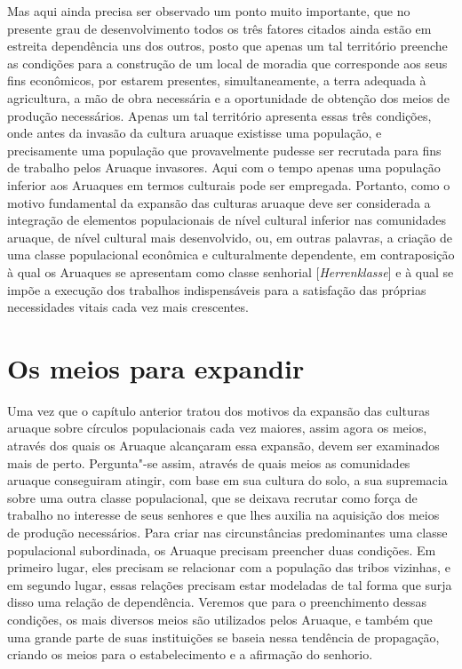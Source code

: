 Mas aqui ainda precisa ser observado um ponto muito importante, que no
presente grau de desenvolvimento todos os três fatores citados ainda
estão em estreita dependência uns dos outros, posto que apenas um tal
território preenche as condições para a construção de um local de
moradia que corresponde aos seus fins econômicos, por estarem presentes,
simultaneamente, a terra adequada à agricultura, a mão de obra
necessária e a oportunidade de obtenção dos meios de produção
necessários. Apenas um tal território apresenta essas três condições,
onde antes da invasão da cultura aruaque existisse uma população, e
precisamente uma população que provavelmente pudesse ser recrutada para
fins de trabalho pelos Aruaque invasores. Aqui com o tempo apenas uma
população inferior aos Aruaques em termos culturais pode ser empregada.
Portanto, como o motivo fundamental da expansão das culturas aruaque
deve ser considerada a integração de elementos populacionais de nível
cultural inferior nas comunidades aruaque, de nível cultural mais
desenvolvido, ou, em outras palavras, a criação de uma classe
populacional econômica e culturalmente dependente, em contraposição à
qual os Aruaques se apresentam como classe senhorial
{[}\emph{Herrenklasse}{]} e à qual se impõe a execução dos trabalhos
indispensáveis para a satisfação das próprias necessidades vitais cada
vez mais crescentes.


\chapter*{Os meios para expandir\smallskip{}}

Uma vez que o capítulo anterior tratou dos motivos da expansão das
culturas aruaque sobre círculos populacionais cada vez maiores, assim
agora os meios, através dos quais os Aruaque alcançaram essa expansão,
devem ser examinados mais de perto. Pergunta"-se assim, através de quais
meios as comunidades aruaque conseguiram atingir, com base em sua
cultura do solo, a sua supremacia sobre uma outra classe populacional,
que se deixava recrutar como força de trabalho no interesse de seus
senhores e que lhes auxilia na aquisição dos meios de produção
necessários. Para criar nas circunstâncias predominantes uma classe
populacional subordinada, os Aruaque precisam preencher duas condições.
Em primeiro lugar, eles precisam se relacionar com a população das
tribos vizinhas, e em segundo lugar, essas relações precisam estar
modeladas de tal forma que surja disso uma relação de dependência.
Veremos que para o preenchimento dessas condições, os mais diversos
meios são utilizados pelos Aruaque, e também que uma grande parte de
suas instituições se baseia nessa tendência de propagação, criando os
meios para o estabelecimento e a afirmação do senhorio.

